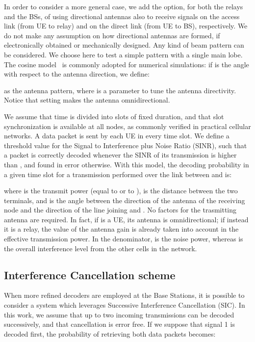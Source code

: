 \documentclass[12pt, letterpaper, onecolumn, draftcls]{IEEEtran}
\begin{document}
In order to consider a more general case, we add the option, for both the relays and the BSs, of using directional antennas also to receive signals on the access link (from UE to relay) and on the direct link (from UE to BS), respectively. We do not make any assumption on how directional antennas are formed, if electronically obtained or mechanically designed.
Any kind of beam pattern can be considered. We choose here to test a simple pattern with a single main lobe. The cosine model~\cite{cosine} is commonly adopted for numerical simulations: if  is the angle with respect to the antenna direction, we define:

as the antenna pattern, where  is a parameter to tune the antenna directivity. Notice that setting  makes the antenna omnidirectional.

We assume that time is divided into slots of fixed duration, and that slot synchronization is available at all nodes, as commonly verified in practical cellular networks. A data packet is sent by each UE in every time slot. We define a threshold value  for the Signal to Interference plus Noise Ratio (SINR), such that a packet is correctly decoded whenever the SINR of its transmission is higher than , and found in error otherwise. With this model, the decoding probability in a given time slot for a transmission performed over the link between  and  is:

where  is the transmit power (equal to  or to ),  is the distance between the two terminals, and  is the angle between the direction of the antenna of the receiving node  and the direction of the line joining  and . No factors for the trasmitting antenna are required. In fact, if  is a UE, its antenna is omnidirectional; if instead it is a relay, the value of the antenna gain is already taken into account in the effective transmission power. In the denominator,  is the noise power, whereas  is the overall interference level from the other cells in the network.

\subsection{Interference Cancellation scheme}
\label{sec:intcanc}
When more refined decoders are employed at the Base Stations, it is possible to consider a system which leverages Successive Interference Cancellation (SIC). In this work, we assume that up to two incoming transmissions can be decoded successively, and that cancellation is error free. If we suppose that signal 1 is decoded first, the probability of retrieving both data packets becomes:
\end{document}
